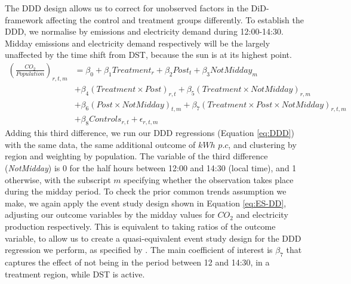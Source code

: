 The DDD design allows us to correct for unobserved factors in the \ac{DiD}-framework affecting the control and treatment groups differently. To establish the \ac{DDD}, we normalise by emissions and electricity demand during 12:00-14:30. Midday emissions and electricity demand respectively will be the largely unaffected by the time shift from DST, because the sun is at its highest point. 
\begin{align}
    \label{eq:DDD}
    \left(\frac{CO_2}{Population}\right)_{r,t,m} &= \beta_0 + \beta_1Treatment_{r} + \beta_2Post_{t} + \beta_3NotMidday_{m}   \\
    & +\beta_4(Treatment \times Post)_{r,t} + 
    \beta_5(Treatment \times NotMidday)_{r,m} \nonumber \\ 
    & +\beta_6(Post \times NotMidday)_{t,m} + \beta_7 (Treatment \times Post \times NotMidday)_{r,t,m} \nonumber \\ 
    &+ \beta_8 Controls_{r,t}  + \epsilon_{r,t,m}
    \nonumber 
\end{align}
Adding this third difference, we run our DDD regressions (Equation \ref{eq:DDD}) with the same data, the same additional outcome of $kWh$ $p.c$, and clustering by region and weighting by population. The variable of the third difference (\textit{NotMidday}) is 0 for the half hours between 12:00 and 14:30 (local time), and 1 otherwise, with the subscript $m$ specifying whether the observation takes place during the midday period.
To check the prior common trends assumption we make, we again apply the event study design shown in Equation \ref{eq:ES-DD}, adjusting our outcome variables by the midday values for $CO_2$ and electricity production respectively. This is equivalent to taking ratios of the outcome variable, to allow us to create a quasi-equivalent event study design for the \ac{DDD} regression we perform, as specified by \textcite{olden_triple_2022}. The main coefficient of interest is $\beta_7$ that captures the effect of not being in the period between 12 and 14:30, in a treatment region, while \ac{DST} is active.

